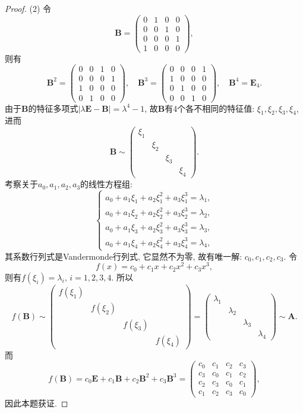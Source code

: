 \documentclass[../../main.tex]{subfiles}%
\begin{document}
\begin{proof}
(2) 令
$$
\boldsymbol{B} = \begin{pmatrix}
0 & 1 & 0 & 0 \\
0 & 0 & 1 & 0 \\
0 & 0 & 0 & 1 \\
1 & 0 & 0 & 0
\end{pmatrix},
$$
则有
$$
\boldsymbol{B}^2 = \begin{pmatrix}
0 & 0 & 1 & 0 \\
0 & 0 & 0 & 1 \\
1 & 0 & 0 & 0 \\
0 & 1 & 0 & 0
\end{pmatrix}, \quad \boldsymbol{B}^3 = \begin{pmatrix}
0 & 0 & 0 & 1 \\
1 & 0 & 0 & 0 \\
0 & 1 & 0 & 0 \\
0 & 0 & 1 & 0
\end{pmatrix}, \quad \boldsymbol{B}^4 = \boldsymbol{E}_4.
$$
由于$\boldsymbol{B}$的特征多项式$|\lambda \boldsymbol{E} - \boldsymbol{B}| = \lambda^4 - 1$, 故$\boldsymbol{B}$有4个各不相同的特征值: $\xi_1,\xi_2,\xi_3,\xi_4$, 进而
$$
\boldsymbol{B} \sim \begin{pmatrix}
\xi_1 & & & \\
& \xi_2 & & \\
& & \xi_3 & \\
& & & \xi_4
\end{pmatrix}.
$$
考察关于$a_0,a_1,a_2,a_3$的线性方程组:
$$
\begin{cases}
a_0 + a_1 \xi_1 + a_2 \xi_1^2 + a_3 \xi_1^3 = \lambda_1, \\
a_0 + a_1 \xi_2 + a_2 \xi_2^2 + a_3 \xi_2^3 = \lambda_2, \\
a_0 + a_1 \xi_3 + a_2 \xi_3^2 + a_3 \xi_3^3 = \lambda_3, \\
a_0 + a_1 \xi_4 + a_2 \xi_4^2 + a_3 \xi_4^3 = \lambda_4,
\end{cases}
$$
其系数行列式是Vandermonde行列式, 它显然不为零, 故有唯一解: $c_0,c_1,c_2,c_3$. 令
$$
f(x) = c_0 + c_1 x + c_2 x^2 + c_3 x^3,
$$
则有$f(\xi_i) = \lambda_i, \, i = 1,2,3,4$. 所以
$$
f(\boldsymbol{B}) \sim \begin{pmatrix}
f(\xi_1) & & & \\
& f(\xi_2) & & \\
& & f(\xi_3) & \\
& & & f(\xi_4)
\end{pmatrix} = \begin{pmatrix}
\lambda_1 & & & \\
& \lambda_2 & & \\
& & \lambda_3 & \\
& & & \lambda_4
\end{pmatrix} \sim \boldsymbol{A}.
$$
而
$$
f(\boldsymbol{B}) = c_0 \boldsymbol{E} + c_1 \boldsymbol{B} + c_2 \boldsymbol{B}^2 + c_3 \boldsymbol{B}^3 = \begin{pmatrix}
c_0 & c_1 & c_2 & c_3 \\
c_3 & c_0 & c_1 & c_2 \\
c_2 & c_3 & c_0 & c_1 \\
c_1 & c_2 & c_3 & c_0
\end{pmatrix},
$$
因此本题获证.


\end{proof}
\end{document}
